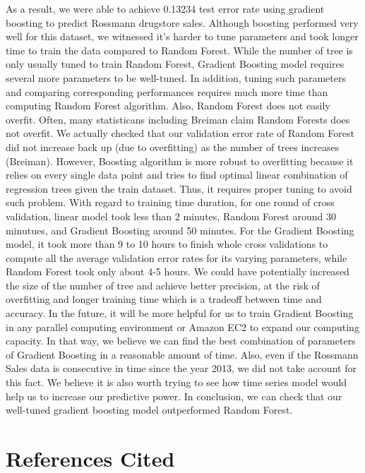 \documentclass[letterpaper,twocolumn,11pt]{article}
\begin{document}
    As a result, we were able to achieve 0.13234 test error rate using gradient boosting to predict Rossmann drugstore sales. Although boosting performed very well for this dataset, we witnessed it's harder to tune parameters and took longer time to train the data compared to Random Forest. While the number of tree is only usually tuned to train Random Forest, Gradient Boosting model requires several more parameters to be well-tuned. In addition, tuning such parameters and comparing corresponding performances requires much more time than computing Random Forest algorithm. Also, Random Forest does not easily overfit. Often, many statisticans including Breiman claim Random Forests does not overfit. We actually checked that our validation error rate of Random Forest did not increase back up (due to overfitting) as the number of trees increases (Breiman). However, Boosting algorithm is more robust to overfitting because it relies on every single data point and tries to find optimal linear combination of regression trees given the train dataset. Thus, it requires proper tuning to avoid such problem. 
    With regard to training time duration, for one round of cross validation, linear model took less than 2 minutes, Random Forest around 30 minutues, and Gradient Boosting around 50 minutes. For the Gradient Boosting model, it took more than 9 to 10 hours to finish whole cross validations to compute all the average validation error rates for its varying parameters, while Random Forest took only about 4-5 hours. We could have potentially increased the size of the number of tree and achieve better precision, at the risk of overfitting and longer training time which is a tradeoff between time and accuracy. In the future, it will be more helpful for us to train Gradient Boosting in any parallel computing environment or Amazon EC2 to expand our computing capacity. In that way, we believe we can find the best combination of parameters of Gradient Boosting in a reasonable amount of time. Also, even if the Rossmann Sales data is consecutive in time since the year 2013, we did not take account for this fact. We believe it is also worth trying to see how time series model would help us to increase our predictive power. 
In conclusion, we can check that our well-tuned gradient boosting model outperformed Random Forest. 

\section{References Cited}
\end{document}
